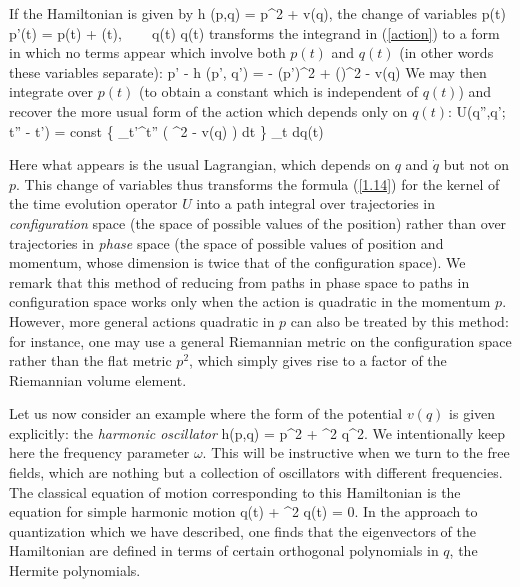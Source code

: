 If the Hamiltonian is given by 
\beq h (p,q) =  p^2 + v(q), \eeq
the change of variables
\beq p(t)  \mapsto p'(t)  = p(t)  + (t), ~~~ q(t) \mapsto  q(t) \eeq
transforms the integrand in  (\ref{action}) to a form in which 
no terms appear which involve both $p(t) $ and $q(t)$ (in other 
words these variables separate):
\beq \label{newaction}
p'  
- h (p', q') = - (p')^2 +  ()^2 - v(q) \eeq
We may then integrate over $p(t) $ (to obtain 
a constant which is independent of $q(t)$) and recover the more usual form
of
 the action which depends only on $q(t)$:
\beq U(q'',q'; t'' - t') = {\rm const} \int \exp \{ \isq \int_{t'}^{t''}
( \half {}^2 - v(q) ) dt \} \prod_{t} dq(t) \eeq


 Here what appears is   the usual Lagrangian,
which depends on $q$ and $\dot{q}$ but not on $p$. 
This change of variables thus transforms the formula (\ref{1.14})
for the kernel of the time evolution operator  $U$ into a path 
integral over trajectories in {\em configuration} space (the space 
of possible values of the position) rather than over trajectories
in {\em phase} space (the space of possible values of position and 
momentum, whose dimension is twice that of the configuration 
space). We remark that this method of reducing from paths in phase space 
to paths in configuration space works only when the action is 
quadratic in the momentum $p$. However, more general actions 
quadratic in $p$ can also be treated by this method: for instance,
one may use a general Riemannian metric on the configuration space
rather than the flat metric $p^2$, which simply gives rise to a factor 
of the Riemannian volume element.

\nc{\hatastar}{{ \hat{\astar} }}

Let us now consider an example where the form of the potential 
$v(q)$ is given explicitly: the {\em harmonic oscillator} 
\beq \label{harmosc} 
h(p,q) = \half p^2 + \half \omega^2 q^2. \eeq
We intentionally keep here the frequency parameter $\omega$. This
will be instructive when we turn to the free fields, which 
are nothing but a collection of oscillators with different 
frequencies.
The classical equation of motion corresponding to this Hamiltonian 
is the equation for simple harmonic motion
\beq \label{shm}
 q(t)  + \omega^2 q(t) = 0. \eeq
In the approach to quantization which 
we have described, one finds that
the eigenvectors of the Hamiltonian are 
defined in terms of certain
orthogonal polynomials in $q$, the Hermite polynomials. 


